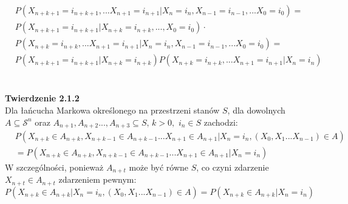 \documentclass[a4paper]{article}
\begin{document}
\begin{align*}
    &P(X_{n+k+1} = i_{n+k+1}, ...X_{n+1} = i_{n+1} | X_n = i_n, X_{n-1} = i_{n-1}, ... X_0 = i_0) = \\
    &P(X_{n+k+1} = i_{n+k+1}|X_{n+k} = i_{n+k}, ..., X_0 = i_0) \cdot\\
    &P(X_{n+k} = i_{n+k}, ...X_{n+1} = i_{n+1} | X_n = i_n, X_{n-1} = i_{n-1}, ... X_0 = i_0) = \\
    & P(X_{n+k+1} = i_{n+k+1}|X_{n+k} = i_{n+k})P(X_{n+k} = i_{n+k}, ...X_{n+1} = i_{n+1} | X_n = i_n)
\end{align*}
\\\\
\textbf{Twierdzenie 2.1.2}\\
Dla łańcucha Markowa określonego na przestrzeni stanów $S$, dla dowolnych $A \subseteq \mathcal{S}^n$ oraz $A_{n+1}, A_{n+2}..., A_{n+3} \subseteq S,\, k>0, \,\, i_n \in S$ zachodzi:
\\
\begin{align*}
&P(X_{n+k} \in A_{n+k}, X_{n+k-1} \in A_{n+k-1}...X_{n+1} \in A_{n+1}|X_n = i_n, (X_{0}, X_{1} ... X_{n-1}) \in A)\\
&= P(X_{n+k} \in A_{n+k}, X_{n+k-1} \in A_{n+k-1}...X_{n+1} \in A_{n+1}|X_n = i_n)
\end{align*}
W szczególności, ponieważ $A_{n+t}$ może być równe $S$, co czyni zdarzenie $X_{n+t} \in A_{n+t}$ zdarzeniem pewnym:\\
$$P(X_{n+k} \in A_{n+k}|X_n = i_n, (X_{0}, X_{1} ... X_{n-1}) \in A) = P(X_{n+k} \in A_{n+k}|X_n = i_n)$$
\end{document}

